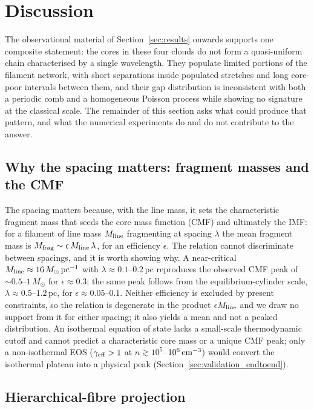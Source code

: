 \documentclass[usenatbib,twoside,twocolumn]{mnras}
\begin{document}
\section{Discussion}

\noindent The observational material of Section~\ref{sec:results} onwards supports one composite statement: the cores in these four clouds do not form a quasi-uniform chain characterised by a single wavelength. They populate limited portions of the filament network, with short separations inside populated stretches and long core-poor intervals between them, and their gap distribution is inconsistent with both a periodic comb and a homogeneous Poisson process while showing no signature at the classical scale. The remainder of this section asks what could produce that pattern, and what the numerical experiments do and do not contribute to the answer.
\label{sec:discussion}

\subsection{Why the spacing matters: fragment masses and the CMF}
\label{sec:cmf}
The spacing matters because, with the line mass, it sets the characteristic fragment mass that seeds the core mass function (CMF) and ultimately the IMF: for a filament of line mass $M_{\rm line}$ fragmenting at spacing $\lambda$ the mean fragment mass is $M_{\rm frag}\sim\epsilon\,M_{\rm line}\,\lambda$, for an efficiency $\epsilon$. The relation cannot discriminate between spacings, and it is worth showing why. A near-critical $M_{\rm line}\approx16\,M_\odot\,{\rm pc^{-1}}$ with $\lambda\approx0.1$--$0.2$\,pc reproduces the observed CMF peak of $\sim0.5$--$1\,M_\odot$ for $\epsilon\approx0.3$; the same peak follows from the equilibrium-cylinder scale, $\lambda\approx0.5$--$1.2$\,pc, for $\epsilon\approx0.05$--$0.1$. Neither efficiency is excluded by present constraints, so the relation is degenerate in the product $\epsilon M_{\rm line}$ and we draw no support from it for either spacing; it also yields a mean and not a peaked distribution. An isothermal equation of state lacks a small-scale thermodynamic cutoff and cannot predict a characteristic core mass or a unique CMF peak; only a non-isothermal EOS ($\gamma_{\rm eff}>1$ at $n\gtrsim10^{5}$--$10^{6}\,{\rm cm^{-3}}$) would convert the isothermal plateau into a physical peak (Section~\ref{sec:validation_endtoend}).

\subsection{Hierarchical-fibre projection}
\label{sec:fibre_projection}
\end{document}
